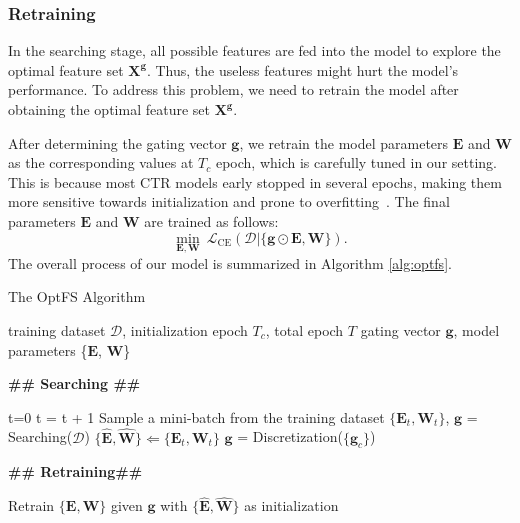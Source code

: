 \documentclass[sigconf]{acmart}
\begin{document}
\subsubsection{Retraining}
\label{sec:method_lbc_retrain}
In the searching stage, all possible features are fed into the model to explore the optimal feature set $\mathbf{X}^\mathbf{g}$. Thus, the useless features might hurt the model's performance. To address this problem, we need to retrain the model after obtaining the optimal feature set $\mathbf{X}^\mathbf{g}$. 

After determining the gating vector $\mathbf{g}$, we retrain the model parameters $\mathbf{E}$ and $\mathbf{W}$ as the corresponding values at $T_c$ epoch, which is carefully tuned in our setting. This is because most CTR models early stopped in several epochs, making them more sensitive towards initialization and prone to overfitting~\cite{CTR-Overfit}. The final parameters $\mathbf{E}$ and $\mathbf{W}$ are trained as follows:
\begin{equation}
\label{eq:loss_retrain}
    \min_{\mathbf{E}, \mathbf{W}} \ \mathcal{L}_{\text{CE}}(\mathcal{D}|\{\mathbf{g} \odot \mathbf{E}, \mathbf{W}\}).
\end{equation}
The overall process of our model is summarized in Algorithm \ref{alg:optfs}.

\begin{algorithm}
	\caption{The OptFS Algorithm} 
    \label{alg:optfs}
	\begin{algorithmic}[1]
		\Require training dataset $\mathcal{D}$, initialization epoch $T_c$, total epoch $T$
        \Ensure gating vector $\mathbf{g}$, model parameters \{$\mathbf{E}$, $\mathbf{W}$\}
        
        \State \textbf{\#\# Searching \#\#}
        
        \State t=0
            \State t = t + 1
                \State Sample a mini-batch from the training dataset
                \State$\{\mathbf{E}_t,\mathbf{W}_t\}$, $\mathbf{g}$ = Searching($\mathcal{D}$) 
            \EndWhile
            \State $\{\hat{\mathbf{E}}, \hat{\mathbf{W}}\} \Leftarrow \{\mathbf{E}_t,\mathbf{W}_t\}$
            \EndIf
        \EndWhile 
        \State $\mathbf{g}$ = Discretization($\{\mathbf{g}_c\}$) 

        \State \textbf{\#\# Retraining\#\#}

        \State Retrain $\{\mathbf{E},\mathbf{W}\}$ given $\mathbf{g}$ with $\{\hat{\mathbf{E}}, \hat{\mathbf{W}}\}$ as initialization  
	\end{algorithmic}
\end{algorithm}
\end{document}
